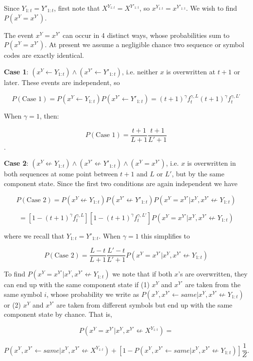 \documentclass{article}
\begin{document}
\begin{appendices}
Since $Y_{1:t} = Y'_{1:t}$,  first note that $X^{Y_{1:t}} = X^{Y'_{1:t}}$, so $x^{Y_{1:t}} = x^{Y'_{1:t}}$. We wish to find $P(x^Y = x^{Y'})$.

The event $x^Y = x^{Y'}$ can occur in 4 distinct ways, whose probabilities sum to $P(x^Y = x^{Y'})$. At present we assume a negligible chance two sequence or symbol codes are exactly identical.

\textbf{Case 1}: $(x^Y \leftarrow Y_{1:t}) \land (x^{Y'} \leftarrow Y'_{1:t})$, i.e. neither $x$ is overwritten at $t+1$ or later. These events are independent, so

$$P(\textrm{Case 1}) = P(x^Y \leftarrow Y_{1:t})P(x^{Y'} \leftarrow Y'_{1:t}) = (t+1)^\gamma f^{\gamma,L}_t(t+1)^\gamma f^{\gamma,L'}_t$$

When $\gamma = 1$, then:

$$P(\textrm{Case 1}) = \frac{t+1}{L+1}\frac{t+1}{L'+1}$$.

\textbf{Case 2}: $(x^Y \not\leftarrow Y_{1:t}) \land (x^{Y'} \not\leftarrow Y'_{1:t}) \land (x^Y = x^{Y'})$, i.e. $x$ is overwritten in both sequences at some point between $t+1$ and $L$ or $L'$, but by the same component state. Since the first two conditions are again independent we have

$$P(\textrm{Case 2}) = P(x^Y \not\leftarrow Y_{1:t})P(x^{Y'} \not\leftarrow Y'_{1:t})P(x^Y = x^{Y'}|x^Y, x^{Y'} \not\leftarrow Y_{1:t})$$

$$= [1 - (t+1)^\gamma f^{\gamma,L}_t][1 - (t+1)^\gamma f^{\gamma,L'}_t]P(x^Y = x^{Y'}|x^Y, x^{Y'} \not\leftarrow Y_{1:t})$$

where we recall that $Y_{1:t} = Y'_{1:t}$. When $\gamma = 1$ this simplifies to

$$P(\textrm{Case 2}) = \frac{L-t}{L+1}\frac{L'-t}{L'+1}P(x^Y = x^{Y'}|x^Y, x^{Y'} \not\leftarrow Y_{1:t})$$

To find $P(x^Y = x^{Y'}|x^Y, x^{Y'} \not\leftarrow Y_{1:t})$ we note that if both $x$'s are overwritten, they can end up with the same component state if (1) $x^Y$ and $x^{Y'}$ are taken from the same symbol $i$, whose probability we write as $P(x^Y, x^{Y'} \leftarrow same|x^Y, x^{Y'} \not\leftarrow Y_{1:t})$ or (2) $x^Y$ and $x^{Y'}$ are taken from different symbols but end up with the same component state by chance. That is,

$$P(x^Y = x^{Y'}|x^Y, x^{Y'} \not\leftarrow X^{Y_{1:t}}) =$$

$$P(x^Y, x^{Y'} \leftarrow same|x^Y, x^{Y'} \not\leftarrow X^{Y_{1:t}}) + [1 - P(x^Y, x^{Y'} \leftarrow same|x^Y, x^{Y'} \not\leftarrow Y_{1:t})]\frac{1}{Z}.$$


\end{appendices}
\end{document}
